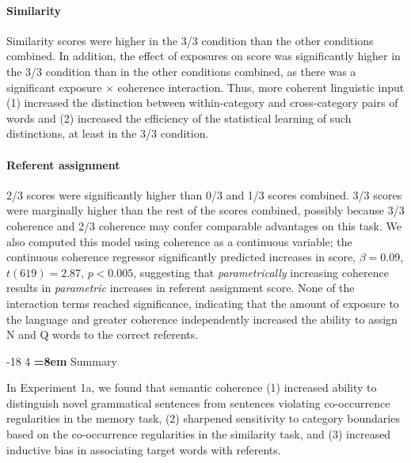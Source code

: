 \documentclass[man,longtable,floatsintext]{my-apa6}
\makeatletter
\renewcommand\subsubsection{\@startsection{subsubsection}{3}{\z@}%
                       {-18\p@ \@plus -4\p@ \@minus -4\p@}%
                       {4\p@ \@plus 2\p@ \@minus 2\p@}%
                       {\normalfont\normalsize\bfseries\boldmath
                        \rightskip=\z@ \@plus 8em\pretolerance=10000 }}
\makeatother
\begin{document}
\paragraph{Similarity} Similarity scores were higher in the 3/3 condition than the other conditions combined. In addition, the effect of exposures on score was significantly higher in the 3/3 condition than in the other conditions combined, as there was a significant exposure $\times$ coherence interaction. Thus, more coherent linguistic input (1) increased the distinction between within-category and cross-category pairs of words and (2) increased the efficiency of the statistical learning of such distinctions, at least in the 3/3 condition.

\paragraph{Referent assignment}

2/3 scores were significantly higher than 0/3 and 1/3 scores combined. 3/3 scores were marginally higher than the rest of the scores combined, possibly because 3/3 coherence and 2/3 coherence may confer comparable advantages on this task. We also computed this model using coherence as a continuous variable; the continuous coherence regressor significantly predicted increases in score, $\beta = 0.09$, $t(619) = 2.87$, $p < 0.005$, suggesting that \emph{parametrically} increasing coherence results in \emph{parametric} increases in referent assignment score. None of the interaction terms reached significance, indicating that the amount of exposure to the language and greater coherence independently increased the ability to assign N and Q words to the correct referents.


\subsubsection{Summary}

In Experiment 1a, we found that semantic coherence (1) increased ability to distinguish novel grammatical sentences from sentences violating co-occurrence regularities in the memory task, (2) sharpened sensitivity to category boundaries based on the co-occurrence regularities in the similarity task, and (3) increased inductive bias in associating target words with referents.
\end{document}
